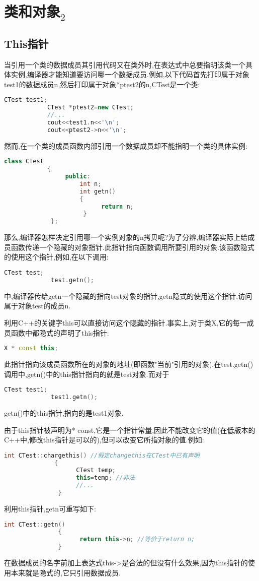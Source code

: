 \documentclass{article}
\begin{document}
\section{类和对象$_{\text{2}}$}
\label{sec-2}
\subsection{This指针}
\label{sec-2-1}
当引用一个类的数据成员其引用代码又在类外时,在表达式中总要指明该类一个具体实例,编译器才能知道要访问哪一个数据成员.例如,以下代码首先打印属于对象test1的数据成员n,然后打印属于对象*ptest2的n,CTest是一个类:
\begin{lstlisting}[language=c++]
            CTest test1;
            CTest *ptest2=new CTest;
            //...
            cout<<test1.n<<'\n';
            cout<<ptest2->n<<'\n';
\end{lstlisting}
然而,在一个类的成员函数内部引用一个数据成员却不能指明一个类的具体实例:
\begin{lstlisting}[language=c++]
            class CTest
            {
                 public:
                     int n;
                     int getn()
                     {
                           return n;
                      }
             };
\end{lstlisting}
那么,编译器怎样决定引用哪一个实例对象的n拷贝呢?为了分辨,编译器实际上给成员函数传递一个隐藏的对象指针.此指针指向函数调用所要引用的对象.该函数隐式的使用这个指针,例如,在以下调用:
\begin{lstlisting}[language=c++]
             CTest test;
             test.getn();
\end{lstlisting}
中,编译器传给getn一个隐藏的指向test对象的指针,getn隐式的使用这个指针,访问属于对象test的成员n.

利用C++的关键字this可以直接访问这个隐藏的指针.事实上,对于类X,它的每一成员函数中都隐式的声明了this指针:
\begin{lstlisting}[language=c++]
              X * const this;
\end{lstlisting}
此指针指向该成员函数所在的对象的地址(即函数"当前"引用的对象).在test.getn()调用中,getn()中的this指针指向的就是test对象.而对于
\begin{lstlisting}[language=c++]
             CTest test1;
             test1.getn();
\end{lstlisting}
getn()中的this指针,指向的是test1对象.

由于this指针被声明为* const,它是一个指针常量,因此不能改变它的值(在低版本的C++中,修改this指针是可以的),但可以改变它所指对象的值.例如:
\begin{lstlisting}[language=c++]
              int CTest::chargethis() //假定changethis在CTest中已有声明
              {
                    CTest temp;
                    this=temp; //非法
                    //...
               }
\end{lstlisting}
利用this指针,getn可重写如下:
\begin{lstlisting}[language=c++]
               int CTest::getn()
               { 
                     return this->n; //等价于return n;
               }
\end{lstlisting}
在数据成员的名字前加上表达式this->是合法的但没有什么效果,因为this指针的使用本来就是隐式的,它只引用数据成员.
\end{document}

